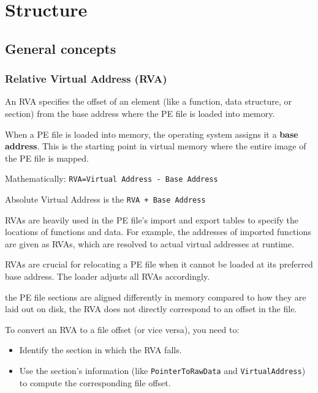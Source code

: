 \section{Structure}
\subsection{General concepts}

\subsubsection{Relative Virtual Address (RVA)}
An RVA specifies the offset of an element (like a function, data structure, or section) from the base address where the PE file is loaded into memory.

When a PE file is loaded into memory, the operating system assigns it a {\bf base address}. This is the starting point in virtual memory where the entire image of the PE file is mapped.

Mathematically: \verb+RVA=Virtual Address - Base Address+

Absolute Virtual Address is the \verb-RVA + Base Address-

RVAs are heavily used in the PE file's import and export tables to specify the locations of functions and data. For example, the addresses of imported functions are given as RVAs, which are resolved to actual virtual addresses at runtime.

RVAs are crucial for relocating a PE file when it cannot be loaded at its preferred base address. The loader adjusts all RVAs accordingly.

the PE file sections are aligned differently in memory compared to how they are laid out on disk, the RVA does not directly correspond to an offset in the file. 

To convert an RVA to a file offset (or vice versa), you need to:
\begin{itemize}
    \item Identify the section in which the RVA falls.
    \item Use the section's information (like \verb+PointerToRawData+ and \verb+VirtualAddress+) to compute the corresponding file offset.
\end{itemize}

\subsubsection{}

